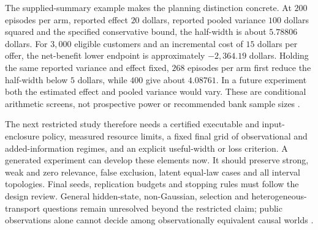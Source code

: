 The supplied-summary example makes the planning distinction concrete.
At $200$ episodes per arm, reported effect $20$ dollars, reported
pooled variance $100$ dollars squared and the specified conservative
bound, the half-width is about $5.78806$ dollars. For $3{,}000$
eligible customers and an incremental cost of $15$ dollars per offer,
the net-benefit lower endpoint is approximately $-2{,}364.19$ dollars.
Holding the same reported variance and effect fixed, $268$ episodes
per arm first reduce the half-width below $5$ dollars, while $400$
give about $4.08761$. In a future experiment both the estimated effect
and pooled variance would vary. These are conditional arithmetic
screens, not prospective power or recommended bank sample sizes
\cite{exec13_temporal_design}.

The next restricted study therefore needs a certified executable and
input-enclosure policy, measured resource limits, a fixed final grid
of observational and added-information regimes, and an explicit
useful-width or loss criterion. A generated experiment can develop
these elements now. It should preserve strong, weak and zero relevance,
false exclusion, latent equal-law cases and all interval topologies.
Final seeds, replication budgets and stopping rules must follow the
design review. General hidden-state, non-Gaussian, selection and
heterogeneous-transport questions remain unresolved beyond the
restricted claim; public observations alone cannot decide among
observationally equivalent causal worlds
\cite{exec13_temporal_design}.
\label{exec13:temporal-design-review-end}
